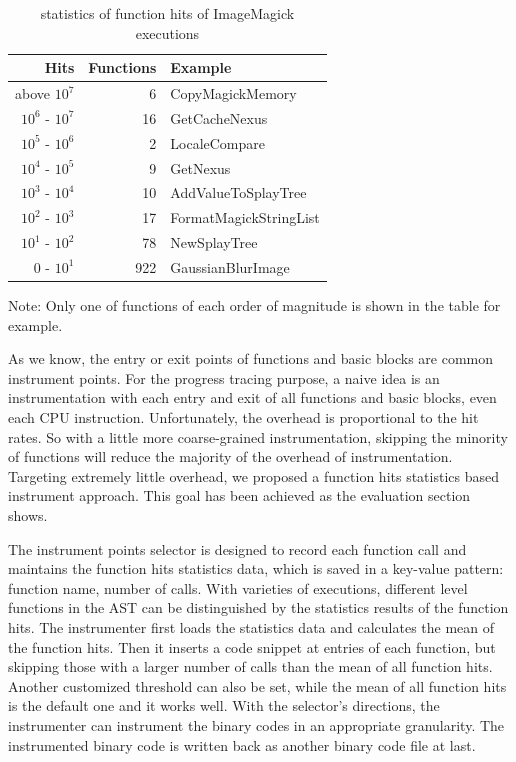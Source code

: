 \begin{table}[h]
\caption{statistics of function hits of ImageMagick executions}
\label{table:inst-stats}
\begin{center}
\begin{tabular}{r|r|l}
\hline
Hits & Functions & Example \\
\hline
above $10^7$ & 6 & CopyMagickMemory \\
$10^6$ - $10^7$ & 16 & GetCacheNexus \\
$10^5$ - $10^6$ & 2 & LocaleCompare \\
$10^4$ - $10^5$ & 9 & GetNexus \\
$10^3$ - $10^4$ & 10 & AddValueToSplayTree \\
$10^2$ - $10^3$ & 17 & FormatMagickStringList \\
$10^1$ - $10^2$ & 78 & NewSplayTree \\
$0$    - $10^1$ & 922 & GaussianBlurImage \\
\hline
\end{tabular}
\end{center}
Note: Only one of functions of each order of magnitude is shown in the table for example.
\end{table}

As we know, the entry or exit points of functions and basic blocks are common instrument points. For the progress tracing purpose, a naive idea is an instrumentation with each entry and exit of all functions and basic blocks, even each CPU instruction. Unfortunately, the overhead is proportional to the hit rates. So with a little more coarse-grained instrumentation, skipping the minority of functions will reduce the majority of the overhead of instrumentation. Targeting extremely little overhead, we proposed a function hits statistics based instrument approach. This goal has been achieved as the evaluation section shows.

The instrument points selector is designed to record each function call and maintains the function hits statistics data, which is saved in a key-value pattern: function name, number of calls. With varieties of executions, different level functions in the AST can be distinguished by the statistics results of the function hits. The instrumenter first loads the statistics data and calculates the mean of the function hits. Then it inserts a code snippet at entries of each function, but skipping those with a larger number of calls than the mean of all function hits. Another customized threshold can also be set, while the mean of all function hits is the default one and it works well. With the selector's directions, the instrumenter can instrument the binary codes in an appropriate granularity. The instrumented binary code is written back as another binary code file at last.

